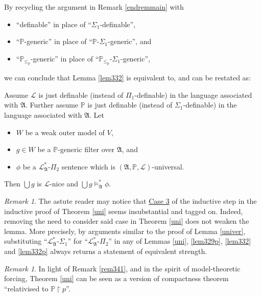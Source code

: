 \documentclass[12pt, twoside]{memoir}
\numberwithin{equation}{section}
\theoremstyle{definition}
\theoremstyle{remark}
\newtheorem{rem}[thm]{Remark}
\theoremstyle{definition}
\theoremstyle{definition}
\newenvironment{customlem}[1]
  {\renewcommand\theinnercustomlem{#1}\innercustomlem}
  {\endinnercustomlem}
\theoremstyle{definition}
\theoremstyle{remark}
\begin{document}
By recycling the argument in Remark \ref{endremmain} with 
\begin{itemize}
    \item ``definable'' in place of ``$\Sigma_1$-definable'', 
    \item ``$\mathbb{P}$-generic'' in place of ``$\mathbb{P}$-$\Sigma_1$-generic'', and
    \item ``$\mathbb{P}_{\leq_p}$-generic'' in place of ``$\mathbb{P}_{\leq_p}$-$\Sigma_1$-generic'',
\end{itemize}
we can conclude that Lemma \ref{lem332} is equivalent to, and can be restated as:

\begin{customlem}{3.2.13$'$}\label{lem332p}
Assume $\mathcal{L}$ is just definable (instead of $\Pi_1$-definable) in the language associated with $\mathfrak{A}$. Further assume $\mathbb{P}$ is just definable (instead of $\Sigma_1$-definable) in the language associated with $\mathfrak{A}$. Let 
\begin{itemize} 
    \item $W$ be a weak outer model of $V$,
    \item $g \in W$ be a $\mathbb{P}$-generic filter over $\mathfrak{A}$, and
    \item $\phi$ be a $\mathcal{L}^{*}_{\mathfrak{A}}$-$\Pi_2$ sentence which is $(\mathfrak{A}, \mathbb{P}, \mathcal{L})$-universal.
\end{itemize} 
Then $\bigcup g$ is $\mathcal{L}$-nice and $\bigcup g \models^{*}_{\mathfrak{A}} \phi$.
\end{customlem}

\begin{rem}\label{rem333}
The astute reader may notice that \hyperref[526c3]{Case 3} of the inductive step in the inductive proof of Theorem \ref{uni} seems insubstantial and tagged on. Indeed, removing the need to consider said case in Theorem \ref{uni} does not weaken the lemma. More precisely, by arguments similar to the proof of Lemma \ref{univer}, substituting ``$\mathcal{L}^{*}_{\mathfrak{A}}$-$\Sigma_1$'' for ``$\mathcal{L}^{*}_{\mathfrak{A}}$-$\Pi_2$'' in any of Lemmas \ref{uni}, \ref{lem329p}, \ref{lem332} and \ref{lem332p} always returns a statement of equivalent strength.
\end{rem}

\begin{rem}
In light of Remark \ref{rem341}, and in the spirit of model-theoretic forcing, Theorem \ref{uni} can be seen as a version of compactness theorem ``relativised to $\mathbb{P} \restriction p$''.
\end{rem}
\end{document}
